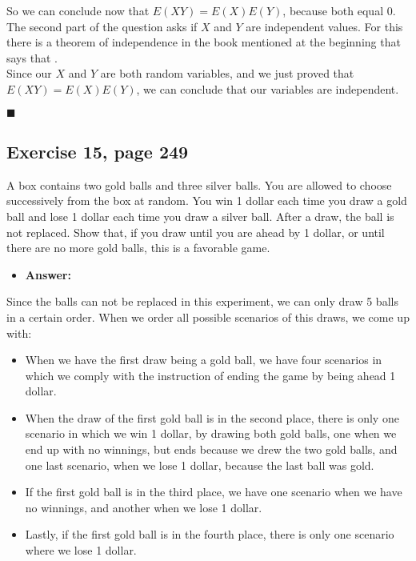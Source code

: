\documentclass{article}
\begin{document}
So we can conclude now that $E(XY) = E(X)E(Y)$, because both equal 0.\\

The second part of the question asks if $X$ and $Y$ are independent values. For this there is a theorem of independence in the book mentioned at the beginning \cite{grin} that says that .\\

Since our $X$ and $Y$ are both random variables, and we just proved that $E(XY) = E(X)E(Y)$, we can conclude that our variables are independent.\\

 
\begin{flushright}
$\blacksquare$
\end{flushright}


\subsection{Exercise 15, page 249}

A box contains two gold balls and three silver balls. You are allowed to choose successively from the box at random. You win 1 dollar each time you draw a gold ball and lose 1 dollar each time you draw a silver ball. After a draw, the ball is not replaced. Show that, if you draw until you are ahead by 1 dollar, or until there are no more gold balls, this is a favorable game.\\

\begin{itemize}
\item \textbf{Answer:}
\end{itemize}

Since the balls can not be replaced in this experiment, we can only draw 5 balls in a certain order. When we order all possible scenarios of this draws, we come up with:

\begin{itemize}
\item When we have the first draw being a gold ball, we have four scenarios in which we comply with the instruction of ending the game by being ahead 1 dollar. 
\item When the draw of the first gold ball is in the second place, there is only one scenario in which we win 1 dollar, by drawing both gold balls, one when we end up with no winnings, but ends because we drew the two gold balls, and one last scenario, when we lose 1 dollar, because the last ball was gold.
\item If the first gold ball is in the third place, we have one scenario when we have no winnings, and another when we lose 1 dollar.
\item Lastly, if the first gold ball is in the fourth place, there is only one scenario where we lose 1 dollar.
\end{itemize}
\end{document}
